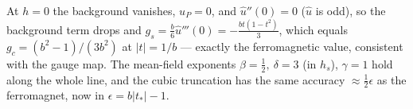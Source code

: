 \documentclass[11pt]{article}
\begin{document}
At $h=0$ the background vanishes, $u_P=0$, and $\hat u''(0)=0$ ($\hat u$ is odd), so the background term
drops and $g_s=\tfrac{b}{6}\hat u'''(0)=-\tfrac{bt(1-t^2)}{3}$, which equals $g_c=(b^2-1)/(3b^2)$ at
$|t|=1/b$ --- exactly the ferromagnetic value, consistent with the gauge map. The mean-field exponents
$\beta=\tfrac12,\ \delta=3$ (in $h_s$), $\gamma=1$ hold along the whole line, and the cubic truncation has
the same accuracy $\approx\tfrac12\epsilon$ as the ferromagnet, now in $\epsilon=b|t_*|-1$.
\end{document}
